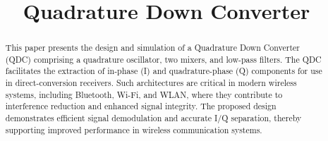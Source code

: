 \documentclass[conference]{IEEEtran}
\begin{document}
\title{Quadrature Down Converter\\
}

\author{
\and
{}
\and
{}
\and
{}
}

\maketitle

\vspace{-1.9mm}

\begin{abstract}
This paper presents the design and simulation of a Quadrature Down Converter (QDC) comprising a quadrature oscillator, two mixers, and low-pass filters. The QDC facilitates the extraction of in-phase (I) and quadrature-phase (Q) components for use in direct-conversion receivers. Such architectures are critical in modern wireless systems, including Bluetooth, Wi-Fi, and WLAN, where they contribute to interference reduction and enhanced signal integrity. The proposed design demonstrates efficient signal demodulation and accurate I/Q separation, thereby supporting improved performance in wireless communication systems.
\end{abstract}
\end{document}

